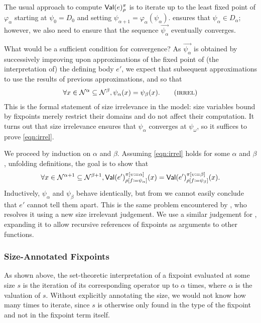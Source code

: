 The usual approach to compute $\textsf{Val}(e)_\rho^\pi$ is to iterate up to the least fixed point of
$\varphi_\alpha$ starting at $\psi_0 = D_0$ and setting
$\psi_{\alpha + 1} = \varphi_\alpha(\psi_\alpha)$.
 ensures that $\psi_\alpha \in D_\alpha$;
however, we also need to ensure that the sequence
$\vec{\psi_\alpha}$ eventually converges.

What would be a sufficient condition for convergence?  As
$\vec{\psi_\alpha}$ is obtained by successively improving upon
approximations of the fixed point of (the interpretation of) the
defining body $e'$, we expect that subsequent approximations to use
the results of previous approximations, and so that
\begin{align*}
  \forall x \in \McN^\alpha \subseteq \McN^\beta, \psi_\alpha(x) = \psi_\beta(x).
  \label{eqn:irrel}\tag{\textsc{irrel}}
\end{align*}
This is the formal statement of size irrelevance in the model:
size variables bound by fixpoints merely restrict their domains and do not
affect their computation.
It turns out that size irrelevance ensures that $\psi_\alpha$
converges at $\psi_\omega$,
so it suffices to prove \eqref{eqn:irrel}.

We proceed by induction on $\alpha$ and $\beta$.
Assuming \eqref{eqn:irrel} holds for some $\alpha$ and $\beta$,
unfolding definitions, the goal is to show that
%
$$\forall x \in \mathcal{N}^{\alpha+1} \subseteq \mathcal{N}^{\beta+1},
  \textsf{Val}(e')_{\rho [f \coloneqq \psi_\alpha]}^{\pi [\upsilon \coloneqq \alpha]}(x) =
  \textsf{Val}(e')_{\rho [f \coloneqq \psi_\beta]}^{\pi [\upsilon \coloneqq \beta]}(x).$$
%
Inductively, $\psi_\alpha$ and $\psi_\beta$ behave identically,
but from  we cannot easily conclude that $e'$ cannot tell
them apart.
This is the same problem encountered by \citet{barras-thesis},
who resolves it using a new size irrelevant judgement.
We use a similar judgement for \langAnother,
expanding it to allow recursive references of fixpoints as arguments
to other functions.

\subsubsection{Size-Annotated Fixpoints}

As shown above, the set-theoretic interpretation of a fixpoint evaluated at some size $s$
is the iteration of its corresponding operator up to $\alpha$ times,
where $\alpha$ is the valuation of $s$.
Without explicitly annotating the size, we would not know how many times to iterate,
since $s$ is otherwise only found in the type of the fixpoint and not in the fixpoint term itself.

